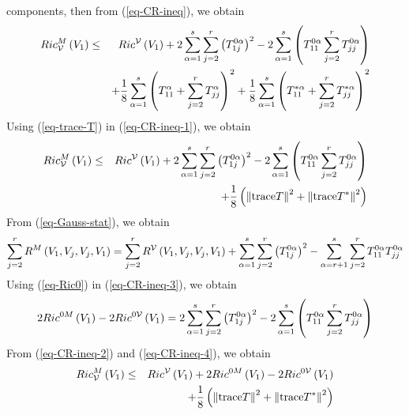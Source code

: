 \documentclass[10pt,a4paper]{article}
\theoremstyle{definition}
\theoremstyle{remark}
\numberwithin{equation}{section}
\begin{document}
components, then from (\ref{eq-CR-ineq}), we obtain%
\begin{eqnarray}
Ric_{{\cal V}}^{M}\left( V_{1}\right) &\leq &Ric^{{\cal V}}\left(
V_{1}\right) +2\sum_{\alpha =1}^{s}\sum_{j=2}^{r}\left( T_{1j}^{0\alpha
}\right) ^{2}-2\sum_{\alpha =1}^{s}\left( T_{11}^{0\alpha
}\sum_{j=2}^{r}T_{jj}^{0\alpha }\right)  \nonumber \\
&&+\frac{1}{8}\sum_{\alpha =1}^{s}\left( T_{11}^{\alpha
}+\sum_{j=2}^{r}T_{jj}^{\alpha }\right) ^{2}+\frac{1}{8}\sum_{\alpha
=1}^{s}\left( T_{11}^{\ast \alpha }+\sum_{j=2}^{r}T_{jj}^{\ast \alpha
}\right) ^{2}  \label{eq-CR-ineq-1}
\end{eqnarray}%
Using (\ref{eq-trace-T}) in (\ref{eq-CR-ineq-1}), we obtain%
\begin{eqnarray}
Ric_{{\cal V}}^{M}\left( V_{1}\right) &\leq &Ric^{{\cal V}}\left(
V_{1}\right) +2\sum_{\alpha =1}^{s}\sum_{j=2}^{r}\left( T_{1j}^{0\alpha
}\right) ^{2}-2\sum_{\alpha =1}^{s}\left( T_{11}^{0\alpha
}\sum_{j=2}^{r}T_{jj}^{0\alpha }\right)  \nonumber \\
&&+\frac{1}{8}\left( \left\Vert {\rm trace}T\right\Vert ^{2}+\left\Vert {\rm %
trace}T^{\ast }\right\Vert ^{2}\right)  \label{eq-CR-ineq-2}
\end{eqnarray}%
From (\ref{eq-Gauss-stat}), we obtain%
\begin{equation}
\sum_{j=2}^{r}R^{M}\left( V_{1},V_{j},V_{j},V_{1}\right) =\sum_{j=2}^{r}R^{%
{\cal V}}\left( V_{1},V_{j},V_{j},V_{1}\right) +\sum_{\alpha
=1}^{s}\sum_{j=2}^{r}\left( T_{1j}^{0\alpha }\right) ^{2}-\sum_{\alpha
=r+1}^{s}\sum_{j=2}^{r}T_{11}^{0\alpha }T_{jj}^{0\alpha }
\label{eq-CR-ineq-3}
\end{equation}%
Using (\ref{eq-Ric0}) in (\ref{eq-CR-ineq-3}), we obtain%
\begin{equation}
2Ric^{0M}\left( V_{1}\right) -2Ric^{0{\cal V}}\left( V_{1}\right)
=2\sum_{\alpha =1}^{s}\sum_{j=2}^{r}\left( T_{1j}^{0\alpha }\right)
^{2}-2\sum_{\alpha =1}^{s}\left( T_{11}^{0\alpha
}\sum_{j=2}^{r}T_{jj}^{0\alpha }\right)  \label{eq-CR-ineq-4}
\end{equation}%
From (\ref{eq-CR-ineq-2}) and (\ref{eq-CR-ineq-4}), we obtain%
\begin{eqnarray}
Ric_{{\cal V}}^{M}\left( V_{1}\right) &\leq &Ric^{{\cal V}}\left(
V_{1}\right) +2Ric^{0M}\left( V_{1}\right) -2Ric^{0{\cal V}}\left(
V_{1}\right)  \nonumber \\
&&+\frac{1}{8}\left( \left\Vert {\rm trace}T\right\Vert ^{2}+\left\Vert {\rm %
trace}T^{\ast }\right\Vert ^{2}\right)  \label{eq-CR-ineq-5}
\end{eqnarray}%
\end{document}
